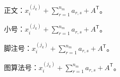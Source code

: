 \documentclass[11pt,openany]{ctexbook}
\begin{document}
正文：$x_i^{(j_k)}+\sum_{r=1}^{n_m}a_{r,s}+A^{\mathsf T}$。

{\small 小号：$x_i^{(j_k)}+\sum_{r=1}^{n_m}a_{r,s}+A^{\mathsf T}$。}

{\footnotesize 脚注号：$x_i^{(j_k)}+\sum_{r=1}^{n_m}a_{r,s}+A^{\mathsf T}$。}

{\fontsize{9pt}{10.8pt}\selectfont 图算法号：$x_i^{(j_k)}+\sum_{r=1}^{n_m}a_{r,s}+A^{\mathsf T}$。}
\end{document}
